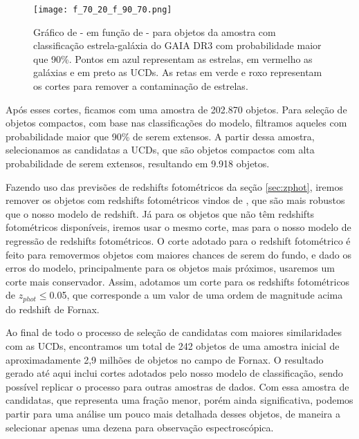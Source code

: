 \begin{figure}[!ht]
    \begin{center}
    \texttt{[image: f\_70\_20\_f\_90\_70.png]}
    \caption[]{Gráfico de  -  em função de  -  para objetos da amostra com classificação estrela-galáxia do GAIA DR3 com probabilidade maior que 90\%. Pontos em azul representam as estrelas, em vermelho as galáxias e em preto as UCDs. As retas em verde e roxo representam os cortes para remover a contaminação de estrelas.}
    \label{flux_radius_3}
    \end{center}
\end{figure}

Após esses cortes, ficamos com uma amostra de 202.870 objetos. Para seleção de objetos compactos, com base nas classificações do modelo, filtramos aqueles com probabilidade maior que 90\% de serem extensos. A partir dessa amostra, selecionamos as candidatas a UCDs, que são objetos compactos com alta probabilidade de serem extensos, resultando em 9.918 objetos.

Fazendo uso das previsões de redshifts fotométricos da seção \ref{sec:zphot}, iremos remover os objetos com redshifts fotométricos vindos de \citep{erik_photoz_2024}, que são mais robustos que o nosso modelo de redshift. Já para os objetos que não têm redshifts fotométricos disponíveis, iremos usar o mesmo corte, mas para o nosso modelo de regressão de redshifts fotométricos. O corte adotado para o redshift fotométrico é feito para removermos objetos com maiores chances de serem do fundo, e dado os erros do modelo, principalmente para os objetos mais próximos, usaremos um corte mais conservador. Assim, adotamos um corte para os redshifts fotométricos de \textit{$z_{phot}$}$\leq$0.05, que corresponde a um valor de uma ordem de magnitude acima do redshift de Fornax.

Ao final de todo o processo de seleção de candidatas com maiores similaridades com as UCDs, encontramos um total de 242 objetos de uma amostra inicial de aproximadamente 2,9 milhões de objetos no campo de Fornax. O resultado gerado até aqui inclui cortes adotados pelo nosso modelo de classificação, sendo possível replicar o processo para outras amostras de dados. Com essa amostra de candidatas, que representa uma fração menor, porém ainda significativa, podemos partir para uma análise um pouco mais detalhada desses objetos, de maneira a selecionar apenas uma dezena para observação espectroscópica.

